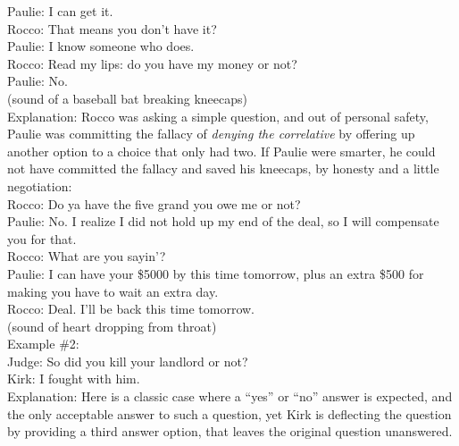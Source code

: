 \documentclass[a4paper,12pt,single,pdftex]{scrartcl}
\begin{document}
    
      Paulie: I can get it.
    \\

    
      Rocco: That means you don’t have it?
    \\

    
      Paulie: I know someone who does.
    \\

    
      Rocco: Read my lips: do you have my money or not?
    \\

    
      Paulie: No.
    \\

    
      (sound of a baseball bat breaking kneecaps)
    \\

    
      Explanation: Rocco was asking a simple question, and out of personal safety, Paulie was committing the fallacy of {\it denying the correlative} by offering up another option to a choice that only had two.  If Paulie were smarter, he could not have committed the fallacy and saved his kneecaps, by honesty and a little negotiation:
    \\

    
      Rocco:  Do ya have the five grand you owe me or not?
    \\

    
      Paulie: No. I realize I did not hold up my end of the deal, so I will compensate you for that.
    \\

    
      Rocco: What are you sayin’?
    \\

    
      Paulie: I can have your \$5000 by this time tomorrow, plus an extra \$500 for making you have to wait an extra day.
    \\

    
      Rocco: Deal.  I’ll be back this time tomorrow.
    \\

    
      (sound of heart dropping from throat)
    \\

    
      Example \#2:
    \\

    
      Judge: So did you kill your landlord or not?
    \\

    
      Kirk: I fought with him.
    \\

    
      Explanation: Here is a classic case where a “yes” or “no” answer is expected, and the only acceptable answer to such a question, yet Kirk is deflecting the question by providing a third answer option, that leaves the original question unanswered.
    \\
\end{document}
